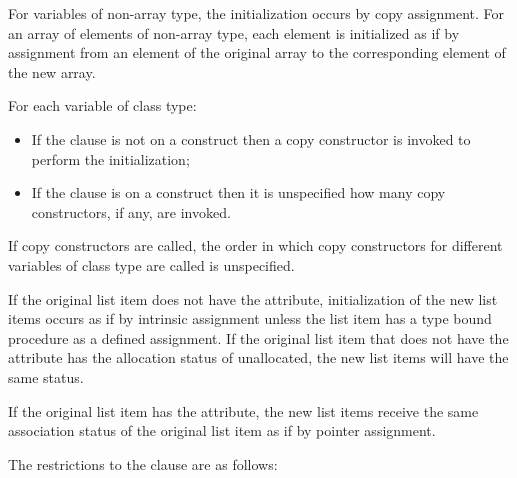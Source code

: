 \begin{ccppspecific}
For variables of non-array type, the initialization occurs by copy assignment. For an
array of elements of non-array type, each element is initialized as if by assignment from
an element of the original array to the corresponding element of the new array.
\end{ccppspecific}
%
\begin{cppspecific}
For each variable of class type:
\begin{itemize}
\item If the  clause is not on a  construct then a copy constructor is invoked to perform the initialization;
\item If the  clause is on a  construct then it is unspecified how many copy constructors, if any, are invoked.
\end{itemize}
If copy constructors are called, the order in which copy constructors for different variables of class type are called is unspecified.
\end{cppspecific}
%
\begin{fortranspecific}
If the original list item does not have the  attribute,
initialization of the new list items occurs as if by intrinsic
assignment unless the list item has a type bound procedure as a
defined assignment.  If the original list item that does not have the
 attribute has the allocation status of unallocated, the
new list items will have the same status.

If the original list item has the  attribute, the new list items receive the same
association status of the original list item as if by pointer assignment.
\end{fortranspecific}
%
\restrictions
The restrictions to the  clause are as follows:

